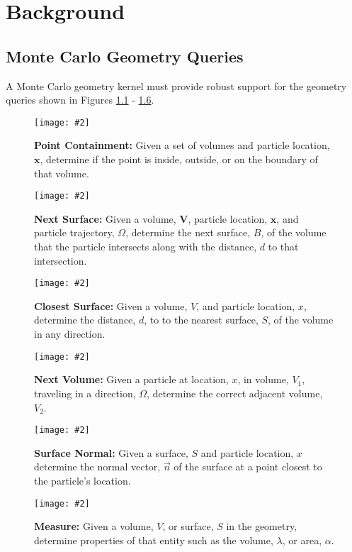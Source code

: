\newcommand{\geomQuery}[3] {
  \begin{figure}[H]
    \centering
    \texttt{[image: \#2]}
    \caption{\textbf{#1:}#3}
    \label{fig:#1}
  \end{figure}
}

\chapter{Background}\label{ch:background}

\section{Monte Carlo Geometry Queries}\label{sec:mc-geom-queries}

A Monte Carlo geometry kernel must provide robust support for the geometry
queries shown in Figures \ref{fig:Point Containment} - \ref{fig:Measure}.

\geomQuery{Point Containment}{plc_query.eps}{
Given a set of volumes and particle location, $\mathbf{x}$, determine if the
point is inside, outside, or on the boundary of that volume.
}

\geomQuery{Next Surface}{dtb_query.eps}{
Given a volume, $\mathbf{V}$, particle location, $\mathbf{x}$, and particle
trajectory, \boldmath$\Omega$, determine the next surface, \boldmath$B$, of
the volume that the particle intersects along with the distance, \boldmath$d$
to that intersection.
}

\geomQuery{Closest Surface}{ctl_query.eps}{
Given a volume, \boldmath$V$, and particle location, \boldmath$x$, determine
the distance, \boldmath$d$, to to the nearest surface, \boldmath$S$, of the
volume in any direction.
}

\geomQuery{Next Volume}{sc_query.eps}{
Given a particle at location, \boldmath$x$, in volume, \boldmath$V_1$,
traveling in a direction, \boldmath$\Omega$, determine the correct adjacent
volume, \boldmath$V_2$.
}

\geomQuery{Surface Normal}{normal_query.eps}{
Given a surface, \boldmath$S$ and particle location, \boldmath$x$ determine
the normal vector, \boldmath$\vec{n}$ of the surface at a point closest to the
particle's location.
}

\geomQuery{Measure}{measure_query.eps}{
Given a volume, \boldmath$V$, or surface, \boldmath$S$ in the geometry,
determine properties of that entity such as the volume, \boldmath$\lambda$,
or area, \boldmath$\alpha$.
}

